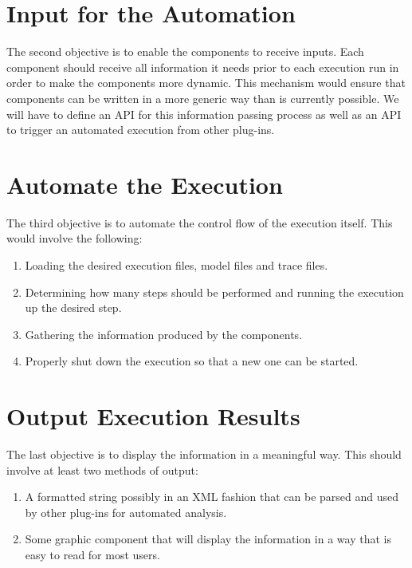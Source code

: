 \section{Input for the Automation}
\label{section:AutoTaskInput}
The second objective is to enable the components to receive inputs.
Each component should receive all information it needs prior to each execution
run in order to make the components more dynamic. This mechanism would ensure
that components can be written in a more generic way than is currently possible.
We will have to define an \ac{API} for this information passing process as well as
an \ac{API} to trigger an automated execution from other plug-ins.


\section{Automate the Execution}
\label{section:AutoTaskExecution}
The third objective is to automate the control flow of the execution itself. This would
involve the following:
\begin{enumerate}
  \item Loading the desired execution files, model files and trace files.
  \item Determining how many steps should be performed and running the execution up the desired step.
  \item Gathering the information produced by the components.
  \item Properly shut down the execution so that a new one can be started.
\end{enumerate}


\section{Output Execution Results}
\label{section:AutoTaskOutput}
The last objective is to display the information in a meaningful way.
This should involve at least two methods of output:
\begin{enumerate}
  \item A formatted string possibly in an XML fashion that can be parsed and
  used by other plug-ins for automated analysis.
  \item Some graphic component that will display the information in a way that is
  easy to read for most users.
\end{enumerate}

